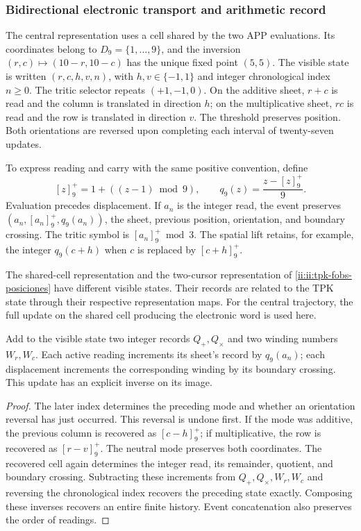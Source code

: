 \subsubsection{Bidirectional electronic transport and arithmetic record}
\label{ii:ii:transporte-electronico}

The central representation uses a cell shared by the two
APP evaluations. Its coordinates belong to \(D_9=\{1,\ldots,9\}\),
and the inversion \((r,c)\mapsto(10-r,10-c)\) has the unique fixed point
\((5,5)\). The visible state is written \((r,c,h,v,n)\), with
\(h,v\in\{-1,1\}\) and integer chronological index \(n\geq0\).
The tritic selector repeats \((+1,-1,0)\). On the additive sheet,
\(r+c\) is read and the column is translated in direction \(h\); on the
multiplicative sheet, \(rc\) is read and the row is translated in direction
\(v\). The threshold preserves position. Both orientations are
reversed upon completing each interval of twenty-seven updates.

To express reading and carry with the same positive convention,
define
\[
 [z]^+_9=1+((z-1)\bmod9),\qquad
 q_9(z)=\frac{z-[z]^+_9}{9}.
\]
Evaluation precedes displacement. If \(a_n\) is the integer
read, the event preserves \((a_n,[a_n]^+_9,q_9(a_n))\), the sheet,
previous position, orientation, and boundary crossing. The
tritic symbol is \([a_n]^+_9\bmod3\). The spatial lift
retains, for example, the integer
\(q_9(c+h)\) when \(c\) is replaced by \([c+h]^+_9\).

The shared-cell representation and the two-cursor
representation of \eqref{ii:ii:tpk-fobs-posiciones} have different visible
states. Their records are related to the TPK state through
their respective representation maps. For the central trajectory,
the full update on the shared cell producing the electronic word
is used here.

\begin{proposition}
\label{ii:ii:electron-inversa-cocientes}
Add to the visible state two integer records \(Q_+,Q_\times\)
and two winding numbers \(W_r,W_c\). Each active reading
increments its sheet's record by \(q_9(a_n)\); each displacement
increments the corresponding winding by its boundary crossing.
This update has an explicit inverse on its image.
\end{proposition}
\begin{proof}
The later index determines the preceding mode and whether an orientation
reversal has just occurred. This reversal is undone first.
If the mode was additive, the previous column is recovered as
\([c-h]^+_9\); if multiplicative, the row is recovered as
\([r-v]^+_9\). The neutral mode preserves both coordinates. The
recovered cell again determines the integer read, its remainder,
quotient, and boundary crossing. Subtracting these increments from
\(Q_+,Q_\times,W_r,W_c\) and reversing the chronological index
recovers the preceding state exactly. Composing these
inverses recovers an entire finite history. Event concatenation
also preserves the order of readings.
\end{proof}

